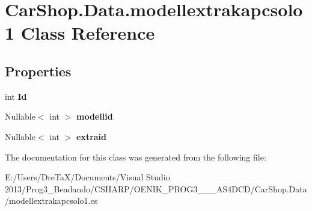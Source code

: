 \hypertarget{class_car_shop_1_1_data_1_1modellextrakapcsolo1}{}\section{Car\+Shop.\+Data.\+modellextrakapcsolo1 Class Reference}
\label{class_car_shop_1_1_data_1_1modellextrakapcsolo1}
\subsection*{Properties}
\begin{DoxyCompactItemize}
\item 
\mbox{\label{class_car_shop_1_1_data_1_1modellextrakapcsolo1_a4f20dd828b163aa7ad335a3bb4a3178e}} 
int {\bfseries Id}
\item 
\mbox{\label{class_car_shop_1_1_data_1_1modellextrakapcsolo1_af2766ec2a57c0adb057332197817ff36}} 
Nullable$<$ int $>$ {\bfseries modellid}
\item 
\mbox{\label{class_car_shop_1_1_data_1_1modellextrakapcsolo1_a9b6ec7f4e47d15100a47e8096534972e}} 
Nullable$<$ int $>$ {\bfseries extraid}
\end{DoxyCompactItemize}


The documentation for this class was generated from the following file\+:\begin{DoxyCompactItemize}
\item 
E\+:/\+Users/\+Dre\+Ta\+X/\+Documents/\+Visual Studio 2013/\+Prog3\+\_\+\+Beadando/\+C\+S\+H\+A\+R\+P/\+O\+E\+N\+I\+K\+\_\+\+P\+R\+O\+G3\+\_\+\_\+\_\+\+A\+S4\+D\+C\+D/\+Car\+Shop.\+Data/modellextrakapcsolo1.\+cs\end{DoxyCompactItemize}
